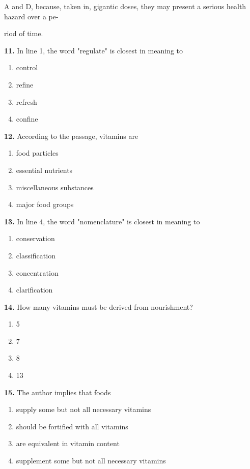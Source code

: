 \documentclass[12pt]{article}
\begin{document}
A and D, because, taken in, gigantic doses, they may present a serious health hazard over a pe-\par
riod of time.\par
\endgroup
\medskip
\noindent\textbf{11.} In line 1, the word "regulate" is closest in meaning to
\begin{enumerate}[label=(\Alph*),leftmargin=*,itemsep=0.2em]
\item control
\item refine
\item refresh
\item confine
\end{enumerate}
\par
\vspace{0.25\baselineskip}
\noindent\textbf{12.} According to the passage, vitamins are
\begin{enumerate}[label=(\Alph*),leftmargin=*,itemsep=0.2em]
\item food particles
\item essential nutrients
\item miscellaneous substances
\item major food groups
\end{enumerate}
\par
\vspace{0.25\baselineskip}
\noindent\textbf{13.} In line 4, the word "nomenclature" is closest in meaning to
\begin{enumerate}[label=(\Alph*),leftmargin=*,itemsep=0.2em]
\item conservation
\item classification
\item concentration
\item clarification
\end{enumerate}
\par
\vspace{0.25\baselineskip}
\noindent\textbf{14.} How many vitamins must be derived from nourishment?
\begin{enumerate}[label=(\Alph*),leftmargin=*,itemsep=0.2em]
\item 5
\item 7
\item 8
\item 13
\end{enumerate}
\par
\vspace{0.25\baselineskip}
\noindent\textbf{15.} The author implies that foods
\begin{enumerate}[label=(\Alph*),leftmargin=*,itemsep=0.2em]
\item supply some but not all necessary vitamins
\item should be fortified with all vitamins
\item are equivalent in vitamin content
\item supplement some but not all necessary vitamins
\end{enumerate}
\end{document}
